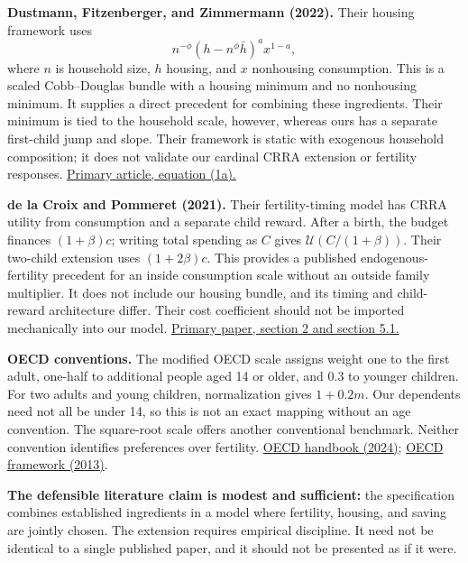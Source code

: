 \documentclass[11pt,letterpaper]{article}
\newcommand{\U}{\mathcal U}
\begin{document}
\textbf{Dustmann, Fitzenberger, and Zimmermann (2022).} Their housing framework uses
\[
n^{-\phi}(h-n^\phi\bar h)^a x^{1-a},
\]
where $n$ is household size, $h$ housing, and $x$ nonhousing consumption. This is a scaled Cobb--Douglas bundle with a housing minimum and no nonhousing minimum. It supplies a direct precedent for combining these ingredients. Their minimum is tied to the household scale, however, whereas ours has a separate first-child jump and slope. Their framework is static with exogenous household composition; it does not validate our cardinal CRRA extension or fertility responses. \href{https://academic.oup.com/ej/article/132/645/1709/6459206}{Primary article, equation (1a).}

\textbf{de la Croix and Pommeret (2021).} Their fertility-timing model has CRRA utility from consumption and a separate child reward. After a birth, the budget finances $(1+\beta)c$; writing total spending as $C$ gives $\U(C/(1+\beta))$. Their two-child extension uses $(1+2\beta)c$. This provides a published endogenous-fertility precedent for an inside consumption scale without an outside family multiplier. It does not include our housing bundle, and its timing and child-reward architecture differ. Their cost coefficient should not be imported mechanically into our model. \href{https://perso.uclouvain.be/david.delacroix/pdfpubli/jet21.pdf}{Primary paper, section 2 and section 5.1.}

\textbf{OECD conventions.} The modified OECD scale assigns weight one to the first adult, one-half to additional people aged 14 or older, and 0.3 to younger children. For two adults and young children, normalization gives $1+0.2m$. Our dependents need not all be under 14, so this is not an exact mapping without an age convention. The square-root scale offers another conventional benchmark. Neither convention identifies preferences over fertility. \href{https://www.oecd.org/en/publications/oecd-handbook-on-the-compilation-of-household-distributional-results-on-income-consumption-and-saving-in-line-with-national-accounts-totals_5a3b9119-en/full-report/component-15.html}{OECD handbook (2024)}; \href{https://www.oecd.org/content/dam/oecd/en/publications/reports/2013/06/oecd-framework-for-statistics-on-the-distribution-of-household-income-consumption-and-wealth_g1g2c4b5/9789264194830-en.pdf}{OECD framework (2013)}.

\textbf{The defensible literature claim is modest and sufficient:} the specification combines established ingredients in a model where fertility, housing, and saving are jointly chosen. The extension requires empirical discipline. It need not be identical to a single published paper, and it should not be presented as if it were.
\end{document}
